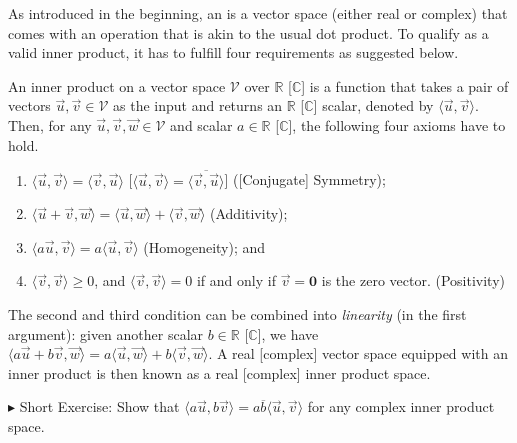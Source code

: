 As introduced in the beginning, an  is a vector space (either real or complex) that comes with an  operation that is akin to the usual dot product. To qualify as a valid inner product, it has to fulfill four requirements as suggested below.
\begin{defn}
\label{defn:innerprod}
An inner product on a vector space $\mathcal{V}$ over $\mathbb{R}$ [$\mathbb{C}$] is a function that takes a pair of vectors $\vec{u}, \vec{v} \in \mathcal{V}$ as the input and returns an $\mathbb{R}$ [$\mathbb{C}$] scalar, denoted by $\langle \vec{u}, \vec{v} \rangle$. Then, for any $\vec{u}, \vec{v}, \vec{w} \in \mathcal{V}$ and scalar $a \in \mathbb{R}$ [$\mathbb{C}$], the following four axioms have to hold.
\begin{enumerate}
    \item $\langle \vec{u}, \vec{v} \rangle = \langle \vec{v}, \vec{u} \rangle$ [$\langle \vec{u}, \vec{v} \rangle = \overline{\langle \vec{v}, \vec{u} \rangle}$] ([Conjugate] Symmetry);
    \item $\langle \vec{u}+\vec{v}, \vec{w} \rangle = \langle \vec{u}, \vec{w} \rangle + \langle \vec{v}, \vec{w} \rangle$ (Additivity);
    \item $\langle a\vec{u}, \vec{v} \rangle = a\langle \vec{u}, \vec{v} \rangle$ (Homogeneity); and
    \item $\langle \vec{v}, \vec{v} \rangle \geq 0$, and $\langle \vec{v}, \vec{v} \rangle = 0$ if and only if $\vec{v} = \textbf{0}$ is the zero vector. (Positivity)
\end{enumerate}
The second and third condition can be combined into \textit{linearity} (in the first argument): given another scalar $b \in \mathbb{R}$ [$\mathbb{C}$], we have $\langle a\vec{u}+b\vec{v}, \vec{w} \rangle = a\langle \vec{u}, \vec{w} \rangle + b\langle \vec{v}, \vec{w} \rangle$. A real [complex] vector space equipped with an inner product is then known as a real [complex] inner product space. 
\end{defn}
$\blacktriangleright$ Short Exercise: Show that $\langle a\vec{u}, b\vec{v} \rangle = a\overline{b}\langle \vec{u}, \vec{v} \rangle$ for any complex inner product space.\footnotemark\par
